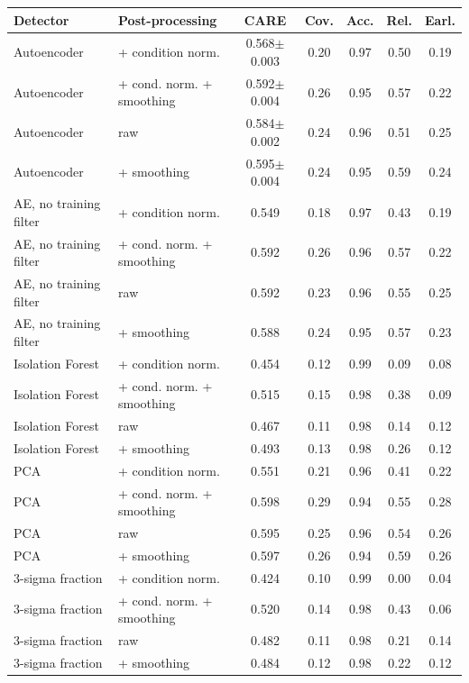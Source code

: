 \begin{tabular}{llccccc}
\toprule
Detector & Post-processing & CARE & Cov. & Acc. & Rel. & Earl.\\
\midrule
Autoencoder & + condition norm. & 0.568$\pm$0.003 & 0.20 & 0.97 & 0.50 & 0.19\\
Autoencoder & + cond. norm. + smoothing & 0.592$\pm$0.004 & 0.26 & 0.95 & 0.57 & 0.22\\
Autoencoder & raw & 0.584$\pm$0.002 & 0.24 & 0.96 & 0.51 & 0.25\\
Autoencoder & + smoothing & 0.595$\pm$0.004 & 0.24 & 0.95 & 0.59 & 0.24\\
AE, no training filter & + condition norm. & 0.549 & 0.18 & 0.97 & 0.43 & 0.19\\
AE, no training filter & + cond. norm. + smoothing & 0.592 & 0.26 & 0.96 & 0.57 & 0.22\\
AE, no training filter & raw & 0.592 & 0.23 & 0.96 & 0.55 & 0.25\\
AE, no training filter & + smoothing & 0.588 & 0.24 & 0.95 & 0.57 & 0.23\\
Isolation Forest & + condition norm. & 0.454 & 0.12 & 0.99 & 0.09 & 0.08\\
Isolation Forest & + cond. norm. + smoothing & 0.515 & 0.15 & 0.98 & 0.38 & 0.09\\
Isolation Forest & raw & 0.467 & 0.11 & 0.98 & 0.14 & 0.12\\
Isolation Forest & + smoothing & 0.493 & 0.13 & 0.98 & 0.26 & 0.12\\
PCA & + condition norm. & 0.551 & 0.21 & 0.96 & 0.41 & 0.22\\
PCA & + cond. norm. + smoothing & 0.598 & 0.29 & 0.94 & 0.55 & 0.28\\
PCA & raw & 0.595 & 0.25 & 0.96 & 0.54 & 0.26\\
PCA & + smoothing & 0.597 & 0.26 & 0.94 & 0.59 & 0.26\\
3-sigma fraction & + condition norm. & 0.424 & 0.10 & 0.99 & 0.00 & 0.04\\
3-sigma fraction & + cond. norm. + smoothing & 0.520 & 0.14 & 0.98 & 0.43 & 0.06\\
3-sigma fraction & raw & 0.482 & 0.11 & 0.98 & 0.21 & 0.14\\
3-sigma fraction & + smoothing & 0.484 & 0.12 & 0.98 & 0.22 & 0.12\\
\bottomrule
\end{tabular}
